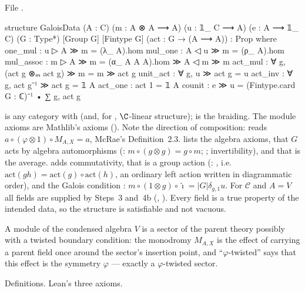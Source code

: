 \noindent File .
\begin{leancode}
structure GaloisData (A : C) (m : A ⊗ A ⟶ A) (u : 𝟙_ C ⟶ A) (e : A ⟶ 𝟙_ C)
    (G : Type*) [Group G] [Fintype G] (act : G → (A ⟶ A)) : Prop where
  one_mul : u ▷ A ≫ m = (λ_ A).hom
  mul_one : A ◁ u ≫ m = (ρ_ A).hom
  mul_assoc : m ▷ A ≫ m = (α_ A A A).hom ≫ A ◁ m ≫ m
  act_mul : ∀ g, (act g ⊗ₘ act g) ≫ m = m ≫ act g
  unit_act : ∀ g, u ≫ act g = u
  act_inv : ∀ g, act g⁻¹ ≫ act g = 𝟙 A
  act_one : act 1 = 𝟙 A
  counit : e ≫ u = (Fintype.card G : ℂ)⁻¹ • ∑ g, act g
\end{leancode}

\begin{dictionary}
 is any category with \lean{[MonoidalCategory C] [BraidedCategory C]} (and, for , $\C$-linear
structure);  is the braiding. The module axioms are Mathlib's  axioms
(). Note the direction of composition:  reads
$a\circ(\varphi\otimes1)\circ M_{A,X}=a$, McRae's Definition~2.3.  lists the algebra axioms, that $G$
acts by algebra automorphisms (: $m\circ(g\otimes g)=g\circ m$; ; invertibility), and that
 is the average.  adds commutativity, that  is a group action (: ,
i.e.\ $\mathrm{act}(gh)=\mathrm{act}(g)\circ\mathrm{act}(h)$, an ordinary left action written in diagrammatic order), and
the Galois condition : $m\circ(1\otimes g)\circ\tilde\imath=|G|\delta_{g,1}u$. For $\mathcal C$ and $A=V$
all fields are supplied by Steps~3 and~4b (, ). Every field is a true
property of the intended data, so the structure is satisfiable and not vacuous.
\end{dictionary}

\begin{physics}
A module of the condensed algebra $V$ is a sector of the parent theory possibly with a twisted boundary condition: the
monodromy $M_{A,X}$ is the effect of carrying a parent field once around the sector's insertion point, and
``$\varphi$-twisted'' says that this effect is the symmetry $\varphi$ --- exactly a $\varphi$-twisted sector.
\end{physics}

\begin{status}
Definitions. Lean's three axioms.
\end{status}


